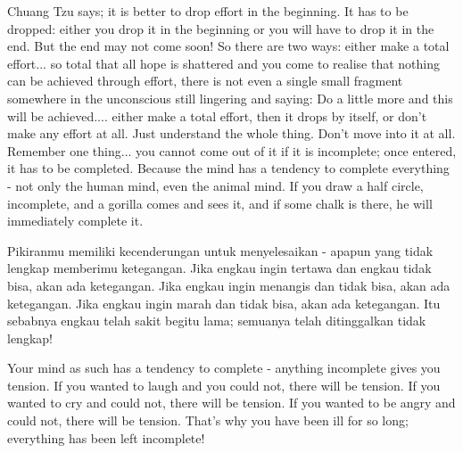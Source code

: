 \english
Chuang Tzu says; it is better to drop effort in the beginning. It has to be dropped: either you drop it in the beginning or you will have to drop it in the end. But the end may not come soon! So there are two ways: either make a total effort... so total that all hope is shattered and you come to realise that nothing can be achieved through effort, there is not even a single small fragment somewhere in the unconscious still lingering and saying: Do a little more and this will be achieved.... either make a total effort, then it drops by itself, or don't make any effort at all. Just understand the whole thing. Don't move into it at all. Remember one thing... you cannot come out of it if it is incomplete; once entered, it has to be completed. Because the mind has a tendency to complete everything - not only the human mind, even the animal mind. If you draw a half circle, incomplete, and a gorilla comes and sees it, and if some chalk is there, he will immediately complete it.

\bahasa
Pikiranmu memiliki kecenderungan untuk menyelesaikan - apapun yang tidak lengkap memberimu ketegangan. Jika engkau ingin tertawa dan engkau tidak bisa, akan ada ketegangan. Jika engkau ingin menangis dan tidak bisa, akan ada ketegangan. Jika engkau ingin marah dan tidak bisa, akan ada ketegangan. Itu sebabnya engkau telah sakit begitu lama; semuanya telah ditinggalkan tidak lengkap!

\english
Your mind as such has a tendency to complete - anything incomplete gives you tension. If you wanted to laugh and you could not, there will be tension. If you wanted to cry and could not, there will be tension. If you wanted to be angry and could not, there will be tension. That's why you have been ill for so long; everything has been left incomplete!
